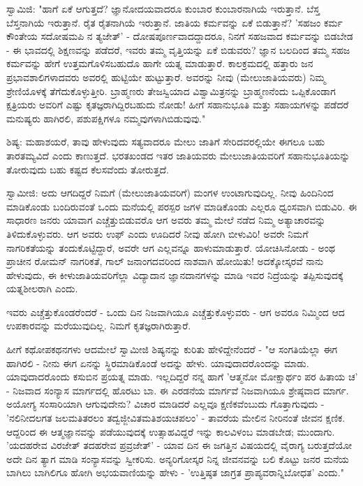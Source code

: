 ಸ್ವಾಮಿಜಿ: "ಹಾಗೆ ಏಕೆ ಆಗುತ್ತದೆ? ಜ್ಞಾನೋದಯವಾದರೂ ಕುಂಬಾರ ಕುಂಬಾರನಾಗಿಯೆ ಇರುತ್ತಾನೆ. ಬೆಸ್ತ ಬೆಸ್ತನಾಗಿಯೆ ಇರುತ್ತಾನೆ. ರೈತ ರೈತನಾಗಿಯೆ ಇರುತ್ತಾನೆ. ಜಾತಿಯ ಕರ್ಮವನ್ನು ಏಕೆ ಬಿಡುತ್ತಾನೆ? 'ಸಹಜಂ ಕರ್ಮ ಕೌಂತೇಯ ಸದೋಷಮಪಿ ನ ತ್ಯಜೇತ್' - ದೋಷಪೂರ್ಣವಾದದ್ದಾದರೂ, ನಿನಗೆ ಸಹಜವಾದ ಕರ್ಮವನ್ನು ಬಿಡಬೇಡ - ಈ ಭಾವದಲ್ಲಿ ಶಿಕ್ಷಣವನ್ನು ಪಡೆದರೆ, ಇವರು ತಮ್ಮ ವೃತ್ತಿಯನ್ನು ಏಕೆ ಬಿಡುವರು? ಜ್ಞಾನ ಬಲದಿಂದ ತಮ್ಮ ಸಹಜ ಕರ್ಮವನ್ನು ಹೇಗೆ ಉತ್ತಮಗೊಳಿಸಬಹುದೊ ಹಾಗೇ ಯತ್ನ ಮಾಡುತ್ತಾರೆ. ಕಾಲಕ್ರಮದಲ್ಲಿ ಹತ್ತಾರು ಜನ ಪ್ರಭಾವಶಾಲಿಗಳಾದವರು ಅವರಲ್ಲಿ ಹುಟ್ಟಿಯೇ ಹುಟ್ಟುತ್ತಾರೆ. ಅವರನ್ನು ನೀವು (ಮೇಲುಜಾತಿಯವರು) ನಿಮ್ಮ ಶ್ರೇಣಿಯೊಳಕ್ಕೆ ತೆಗೆದುಕೊಳ್ಳುತ್ತೀರಿ. ಬ್ರಾಹ್ಮಣರು ತೇಜಸ್ವಿಯಾದ ವಿಶ್ವಾಮಿತ್ರನನ್ನು ಬ್ರಾಹ್ಮಣನೆಂದು ಒಪ್ಪಿಕೊಂಡಾಗ ಕ್ಷತ್ರಿಯರು ಅವರಿಗೆ ಎಷ್ಟು ಕೃತಜ್ಞರಾಗಿದ್ದಿರಬಹುದು ನೋಡು! ಹೀಗೆ ಸಹಾನುಭೂತಿ ಮತ್ತು ಸಹಾಯಗಳನ್ನು ಪಡೆದರೆ ಮನುಷ್ಯರು ಹಾಗಿರಲಿ, ಪಶುಪಕ್ಷಿಗಳೂ ನಮ್ಮವುಗಳಾಗಿಬಿಡುವುವು."

ಶಿಷ್ಯ: ಮಹಾಶಯರೆ, ತಾವು ಹೇಳುವುದು ಸತ್ಯವಾದರೂ ಮೇಲು ಜಾತಿಗೆ ಸೇರಿದವರಲ್ಲಿಯೇ ಈಗಲೂ ಬಹು ತಾರತಮ್ಯವಿದೆ ಎಂದು ಕಾಣುತ್ತದೆ. ಭರತಖಂಡದ ಇತರ ಜಾತಿಯವರು ಮೇಲುಜಾತಿಯವರಿಗೆ ಸಹಾನುಭೂತಿಯನ್ನು ತೋರುವುದು ಬಹು ಕಷ್ಟದ ಕೆಲಸವೆಂದು ತೋರುತ್ತದೆ.

ಸ್ವಾಮೀಜಿ: ಅದು ಆಗದಿದ್ದರೆ ನಿಮಗೆ (ಮೇಲುಜಾತಿಯವರಿಗೆ) ಮಂಗಳ ಉಂಟಾಗುವುದಿಲ್ಲ. ನೀವು ಹಿಂದಿನಿಂದ ಮಾಡಿಕೊಂಡು ಬಂದಿರುವಂತೆ ಒಂದು ಮನೆಯಲ್ಲಿ ಪರಸ್ಪರ ಜಗಳ ಮಾಡಿಕೊಂಡು ಎಲ್ಲರೂ ಧ್ವಂಸವಾಗಿ ಬಿಡುವಿರಿ. ಈ ಸಾಧಾರಣ ಜನರು ಯಾವಾಗ ಎಚ್ಚೆತ್ತುಬಿಡುವರೊ ಆಗ ಅವರು ತಮ್ಮ ಮೇಲೆ ನಡೆದ ನಿಮ್ಮ ಅತ್ಯಾಚಾರವನ್ನು ತಿಳಿದುಕೊಳ್ಳುವರು. ಆಗ ಅವರು ಉಫ್ ಎಂದು ಊದಿದರೆ ನೀವು ಹೋಗಿ ಬೀಳುವಿರಿ! ಅವರೇ ನಿಮಗೆ ನಾಗರಿಕತೆಯನ್ನು ತಂದುಕೊಟ್ಟಿದ್ದಾರೆ, ಅವರೇ ಆಗ ಎಲ್ಲವನ್ನೂ ಹಾಳುಮಾಡುತ್ತಾರೆ. ಯೋಚಿಸಿನೋಡು - ಅಂಥ ಪ್ರಾಚೀನ ರೋಮನ್ ನಾಗರಿಕತೆ, ಗಾಲ್ ಜನಾಂಗದವರಿಂದ ನಾಶವಾಗಿ ಹೋಯಿತು! ಅದಕ್ಕೋಸ್ಕರವೆ ನಾನು ಹೇಳುವುದು, ಈ ಕೀಳುಜಾತಿಯವರಿಗೆಲ್ಲಾ ವಿದ್ಯಾದಾನ ಜ್ಞಾನದಾನಗಳನ್ನು ಮಾಡಿ ಇವರ ನಿದ್ರೆಯನ್ನು ತಪ್ಪಿಸುವುದಕ್ಕೆ ಯತ್ನಶೀಲರಾಗಿ ಎಂದು.

ಇವರು ಎಚ್ಚೆತ್ತುಕೊಂಡರೆಂದರೆ - ಒಂದು ದಿನ ನಿಜವಾಗಿಯೂ ಎಚ್ಚೆತ್ತುಕೊಳ್ಳುವರು - ಆಗ ಅವರೂ ನಿಮ್ಮಿಂದ ಆದ ಉಪಕಾರವನ್ನು ಮರೆಯುವುದಿಲ್ಲ. ನಿಮಗೆ ಕೃತಜ್ಞರಾಗಿರುತ್ತಾರೆ.

ಹೀಗೆ ಕಥೋಪಕಥನಗಳು ಆದಮೇಲೆ ಸ್ವಾಮೀಜಿ ಶಿಷ್ಯನನ್ನು ಕುರಿತು ಹೇಳಿದ್ದೇನೆಂದರೆ - "ಆ ಸಂಗತಿಯೆಲ್ಲಾ ಈಗ ಹಾಗಿರಲಿ - ನೀನು ಈಗ ಏನನ್ನು ಸ್ಥಿರಮಾಡಿಕೊಂಡೆ ಅದನ್ನು ಹೇಳು. ಯಾವುದಾದರೊಂದನ್ನು ಮಾಡು. ಯಾವುದಾದರೊಂದು ಕಸುಬಿನ ಪ್ರಯತ್ನ ಮಾಡು. ಇಲ್ಲದಿದ್ದರೆ ನನ್ನ ಹಾಗೆ 'ಆತ್ಮನೋ ಮೋಕ್ಷಾರ್ಥಂ ಪರ ಹಿತಾಯ ಚ' - ನಿಜವಾದ ಸಂನ್ಯಾಸ ಮಾರ್ಗದಲ್ಲಿ ಹೊರಟು ಬಾ. ಈ ಎರಡನೆಯ ಮಾರ್ಗವೆ ನಿಜವಾಗಿಯೂ ಶ್ರೇಷ್ಠವಾದ ಮಾರ್ಗ. ಅಯೋಗ್ಯ ಸಂಸಾರಿಯಾಗಿ ಆಗುವುದೇನು? ವಿಚಾರ ಮಾಡಿದರೆ ಎಲ್ಲವೂ ಕ್ಷಣಿಕವೆಂಬುದು ಗೊತ್ತಾಗುವುದು - 'ನಲಿನೀದಲಗತ ಜಲಮತಿತರಲಂ ತದ್ವಜ್ಜೀವಿತಮತಿಶಯಚಪಲಂ' - ತಾವರೆಯ ಮೇಲಿನ ನೀರಿನಂತೆ ಜೀವನ ಕ್ಷಣಿಕ. ಆದ್ದರಿಂದ ಈ ಆತ್ಮಜ್ಞಾನವನ್ನು ಪಡೆಯುವುದಕ್ಕೆ ಉತ್ಸಾಹವಿದ್ದರೆ ಇನ್ನು ಕಾಲವಿಳಂಬ ಮಾಡಬೇಡ; ಮುಂದಾಗು. 'ಯದಹರೇವ ವಿರಜೇತ್ ತದಹರೇವ ಪ್ರವ್ರಜೇತ್' - ಯಾವ ದಿನ ಈ ಜಗತ್ತಿನ ವಿಷಯದಲ್ಲಿ ವೈರಾಗ್ಯ ಬರುತ್ತದೆಯೋ ಅದೇ ದಿನ ತ್ಯಾಗ ಮಾಡಿ ಸಂನ್ಯಾಸವನ್ನು ಸ್ವೀಕರಿಸು. ಅನ್ಯರಿಗೋಸ್ಕರ ನಿನ್ನ ಜೀವನವನ್ನು ಬಲಿ ಕೊಟ್ಟು ಜನರ ಮನೆಯ ಬಾಗಿಲು ಬಾಗಿಲಿಗೂ ಹೋಗಿ ಅಭಯವಾಣಿಯನ್ನು ಹೇಳು - 'ಉತ್ತಿಷ್ಠತ ಜಾಗ್ರತ ಪ್ರಾಪ್ಯವರಾನ್ನಿಬೋಧತ' ಎಂದು."

